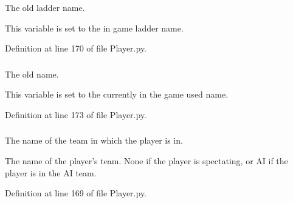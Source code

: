 The old ladder name. 

This variable is set to the in game ladder name. 

Definition at line 170 of file Player.py.

\hypertarget{class_player_1_1_player_a43d105f816af7ba2c6dbe816ffaf4eba}{
\subsubsection[{\_\-\_\-old\_\-name}]{}}
\label{class_player_1_1_player_a43d105f816af7ba2c6dbe816ffaf4eba}


The old name. 

This variable is set to the currently in the game used name. 

Definition at line 173 of file Player.py.

\hypertarget{class_player_1_1_player_ae01a2cfd1449c211cc6b6ca6d6fce853}{
\subsubsection[{\_\-\_\-team}]{}}
\label{class_player_1_1_player_ae01a2cfd1449c211cc6b6ca6d6fce853}


The name of the team in which the player is in. 

The name of the player's team. None if the player is spectating, or AI if the player is in the AI team. 

Definition at line 169 of file Player.py.

\hypertarget{class_player_1_1_player_a323d688193f511184787b2e598222e74}{
\subsubsection[{color}]{}}
\label{class_player_1_1_player_a323d688193f511184787b2e598222e74}


